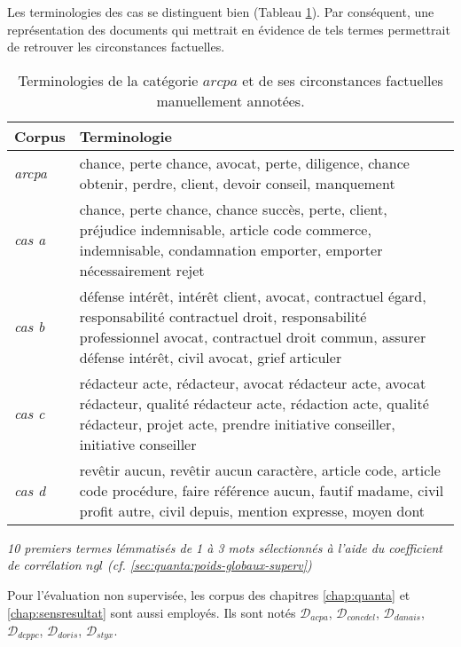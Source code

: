 Les terminologies des cas se distinguent bien (Tableau \ref{tab:similarite:terminologie-resp_avocat}). Par conséquent, une représentation des documents qui mettrait en évidence de tels termes permettrait de retrouver les circonstances factuelles. 
\begin{table}[ht]
	\centering \scriptsize
	\begin{tabular}{|l|p{}|}
		\hline
		\textbf{Corpus} & \textbf{Terminologie} \\ \hline
		\textit{arcpa} & chance, perte chance, avocat, perte, diligence, chance obtenir, perdre, client, devoir conseil, manquement
		\\ \hline
		\textit{cas a} & chance, perte chance, chance succès, perte, client, préjudice indemnisable, article code commerce, indemnisable, condamnation emporter, emporter nécessairement rejet
		\\ \hline
		\textit{cas b} & défense intérêt, intérêt client, avocat, contractuel égard, responsabilité contractuel droit, responsabilité professionnel avocat, contractuel droit commun, assurer défense intérêt, civil avocat, grief articuler
				\\ \hline
		\textit{cas c} & rédacteur acte, rédacteur, avocat rédacteur acte, avocat rédacteur, qualité rédacteur acte, rédaction acte, qualité rédacteur, projet acte, prendre initiative conseiller, initiative conseiller
		\\ \hline
		\textit{cas d} & revêtir aucun, revêtir aucun caractère, article code, article code procédure, faire référence aucun, fautif madame, civil profit autre, civil depuis, mention expresse, moyen dont
		\\ \hline
	\end{tabular}

	\textit{10 premiers termes lémmatisés de 1 à 3 mots sélectionnés à l'aide du coefficient de corrélation $ngl$ (cf. \ref{sec:quanta:poids-globaux-superv})}
	\caption{Terminologies de  la catégorie  $arcpa$ et de ses circonstances factuelles manuellement annotées.}\label{tab:similarite:terminologie-resp_avocat}
\end{table}

Pour l'évaluation non supervisée, les corpus des chapitres \ref{chap:quanta} et \ref{chap:sensresultat} sont aussi employés. Ils sont notés $\mathcal{D}_{acpa}$, $\mathcal{D}_{concdel}$, $\mathcal{D}_{danais}$,$\mathcal{D}_{dcppc}$, $\mathcal{D}_{doris}$, $\mathcal{D}_{styx}$.

